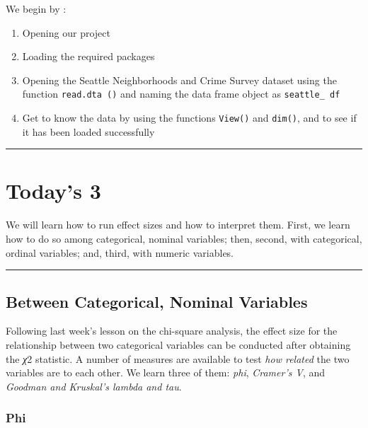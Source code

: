 \documentclass[
]{book}
\begin{document}
We begin by :

\begin{enumerate}
\def\labelenumi{\arabic{enumi}.}
\item
  Opening our project
\item
  Loading the required packages
\item
  Opening the Seattle Neighborhoods and Crime Survey dataset using the function \texttt{read.dta\ ()} and naming the data frame object as \texttt{seattle\_\ df}
\item
  Get to know the data by using the functions \texttt{View()} and \texttt{dim()}, and to see if it has been loaded successfully
\end{enumerate}

\begin{center}\rule{0.5\linewidth}{0.5pt}\end{center}

\hypertarget{todays-3-5}{%
\section{Today's 3}\label{todays-3-5}}

We will learn how to run effect sizes and how to interpret them. First, we learn how to do so among categorical, nominal variables; then, second, with categorical, ordinal variables; and, third, with numeric variables.

\begin{center}\rule{0.5\linewidth}{0.5pt}\end{center}

\hypertarget{between-categorical-nominal-variables}{%
\subsection{Between Categorical, Nominal Variables}\label{between-categorical-nominal-variables}}

Following last week's lesson on the chi-square analysis, the effect size for the relationship between two categorical variables can be conducted after obtaining the \emph{χ}2 statistic. A number of measures are available to test \emph{how related} the two variables are to each other. We learn three of them: \emph{phi}, \emph{Cramer's V}, and \emph{Goodman and Kruskal's lambda and tau}.

\hypertarget{phi}{%
\subsubsection{Phi}\label{phi}}
\end{document}
